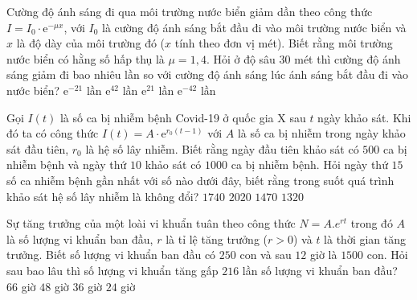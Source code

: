 \begin{ex}%
	Cường độ ánh sáng đi qua môi trường nước biển giảm dần theo công thức $I=I_0\cdot \mathrm{e}^{-\mu x}$, với $I_0$ là cường độ ánh sáng bắt đầu đi vào môi trường nước biển và $x$ là độ dày của môi trường đó ($x$ tính theo đơn vị mét). Biết rằng môi trường nước biển có hằng số hấp thụ là $\mu =1{,}4$. Hỏi ở độ sâu $30$ mét thì cường độ ánh sáng giảm đi bao nhiêu lần so với cường độ ánh sáng lúc ánh sáng bắt đầu đi vào nước biển?
	\choice
	{$\mathrm{e}^{-21}$ lần}
	{\True $\mathrm{e}^{42}$ lần}
	{$\mathrm{e}^{21}$ lần}
	{$\mathrm{e}^{-42}$ lần}
\end{ex}

\begin{ex}%
	Gọi $I(t)$ là số ca bị nhiễm bệnh Covid-19 ở quốc gia X sau $t$ ngày khảo sát. Khi đó ta có công thức $I(t)=A\cdot\mathrm{e}^{r_0(t-1)}$ với $A$ là số ca bị nhiễm trong ngày khảo sát đầu tiên, $r_0$ là hệ số lây nhiễm. Biết rằng ngày đầu tiên khảo sát có $500$ ca bị nhiễm bệnh và ngày thứ $10$ khảo sát có $1000$ ca bị nhiễm bệnh. Hỏi ngày thứ $15$ số ca nhiễm bệnh gần nhất với số nào dưới đây, biết rằng trong suốt quá trình khảo sát hệ số lây nhiễm là không đổi?
	\choice
	{$1740$}
	{$2020$}
	{\True $1470$}
	{$1320$}
\end{ex}

\begin{ex}%
	Sự tăng trưởng của một loài vi khuẩn tuân theo công thức $N=A.e^{rt}$ trong đó $A$ là số lượng vi khuẩn ban đầu, $r$ là tỉ lệ tăng trưởng ($r>0$) và $t$ là thời gian tăng trưởng. Biết số lượng vi khuẩn ban đầu có $250$ con và sau $12$ giờ là $1500$ con. Hỏi sau bao lâu thì số lượng vi khuẩn tăng gấp $216$ lần số lượng vi khuẩn ban đầu?
	\choice
	{$66$ giờ}
	{$48$ giờ}
	{\True $36$ giờ}
	{$24$ giờ}
\end{ex}

